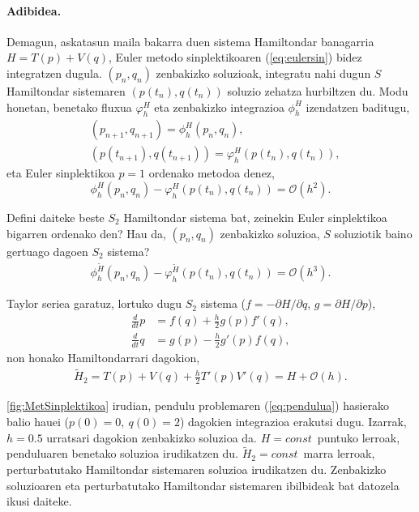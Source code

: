 \paragraph{Adibidea.}
Demagun, askatasun maila bakarra duen sistema Hamiltondar banagarria $H=T(p)+V(q)$, Euler metodo sinplektikoaren (\ref{eq:eulersin}) bidez integratzen dugula.  $(p_n,q_n)$ zenbakizko soluzioak, integratu nahi dugun $S$ Hamiltondar sistemaren $(p(t_n),q(t_n))$ soluzio zehatza hurbiltzen du.  Modu honetan, benetako fluxua $\varphi_h^H$ eta zenbakizko integrazioa $\phi_h^H$ izendatzen baditugu,
\begin{align*}
&(p_{n+1},q_{n+1}) =\phi_h^H(p_n,q_n), \\
&(p(t_{n+1}),q(t_{n+1})) =\varphi_h^H(p(t_n),q(t_n)), 
\end{align*} 
eta Euler sinplektikoa $p=1$ ordenako metodoa denez,
\begin{equation*}
\phi_h^H(p_n,q_n)-\varphi_h^H(p(t_n),q(t_n))= \mathcal{O}(h^2).
\end{equation*}    

Defini daiteke beste $S_2$ Hamiltondar sistema bat, zeinekin Euler sinplektikoa bigarren ordenako den? Hau da, $(p_n,q_n)$ zenbakizko soluzioa, $S$ soluziotik baino gertuago dagoen $S_2$ sistema? 
\begin{align*}
\phi_h^{\widetilde{H}}(p_n,q_n)-\varphi_h^{\widetilde{H}}(p(t_n),q(t_n))= \mathcal{O}(h^3).
\end{align*}

Taylor seriea garatuz, lortuko dugu $S_2$ sistema  ($f=-\partial H/\partial q$, $g=\partial H/\partial p$),
\begin{align*}
\frac{d}{dt} p &= f(q)+ \frac{h}{2} g(p) f'(q),\\
\frac{d}{dt} q &= g(p)- \frac{h}{2} g'(p) f(q),
\end{align*} 
non honako Hamiltondarrari dagokion,
\begin{align*}
\widetilde{H}_2=T(p)+V(q)+\frac{h}{2} T'(p) V'(q) = H+\mathcal{O}(h).
\end{align*}

\ref{fig:MetSinplektikoa} irudian, pendulu problemaren (\ref{eq:pendulua}) hasierako balio hauei ($p(0)=0, \ q(0)=2$) dagokien integrazioa erakutsi dugu. Izarrak, $h=0.5$ urratsari dagokion zenbakizko soluzioa da. $H=const$~puntuko lerroak, penduluaren benetako soluzioa irudikatzen du.  $\widetilde{H}_2=const$~marra lerroak, perturbatutako Hamiltondar sistemaren soluzioa irudikatzen du. Zenbakizko soluzioaren eta perturbatutako Hamiltondar sistemaren ibilbideak bat datozela ikusi daiteke. 

